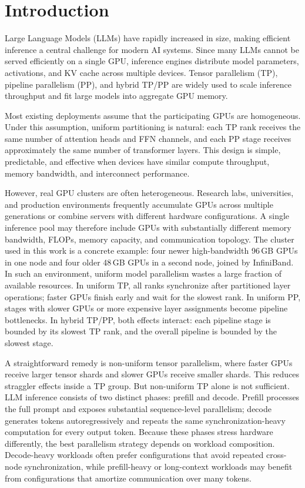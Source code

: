 \documentclass[twocolumn]{article}
\begin{document}
\section{Introduction}

Large Language Models (LLMs) have rapidly increased in size, making efficient inference a central challenge for modern AI systems. Since many LLMs cannot be served efficiently on a single GPU, inference engines distribute model parameters, activations, and KV cache across multiple devices. Tensor parallelism (TP), pipeline parallelism (PP), and hybrid TP/PP are widely used to scale inference throughput and fit large models into aggregate GPU memory.

Most existing deployments assume that the participating GPUs are homogeneous. Under this assumption, uniform partitioning is natural: each TP rank receives the same number of attention heads and FFN channels, and each PP stage receives approximately the same number of transformer layers. This design is simple, predictable, and effective when devices have similar compute throughput, memory bandwidth, and interconnect performance.

However, real GPU clusters are often heterogeneous. Research labs, universities, and production environments frequently accumulate GPUs across multiple generations or combine servers with different hardware configurations. A single inference pool may therefore include GPUs with substantially different memory bandwidth, FLOPs, memory capacity, and communication topology. The cluster used in this work is a concrete example: four newer high-bandwidth 96\,GB GPUs in one node and four older 48\,GB GPUs in a second node, joined by InfiniBand. In such an environment, uniform model parallelism wastes a large fraction of available resources. In uniform TP, all ranks synchronize after partitioned layer operations; faster GPUs finish early and wait for the slowest rank. In uniform PP, stages with slower GPUs or more expensive layer assignments become pipeline bottlenecks. In hybrid TP/PP, both effects interact: each pipeline stage is bounded by its slowest TP rank, and the overall pipeline is bounded by the slowest stage.

A straightforward remedy is non-uniform tensor parallelism, where faster GPUs receive larger tensor shards and slower GPUs receive smaller shards. This reduces straggler effects inside a TP group. But non-uniform TP alone is not sufficient. LLM inference consists of two distinct phases: prefill and decode. Prefill processes the full prompt and exposes substantial sequence-level parallelism; decode generates tokens autoregressively and repeats the same synchronization-heavy computation for every output token. Because these phases stress hardware differently, the best parallelism strategy depends on workload composition. Decode-heavy workloads often prefer configurations that avoid repeated cross-node synchronization, while prefill-heavy or long-context workloads may benefit from configurations that amortize communication over many tokens.
\end{document}
